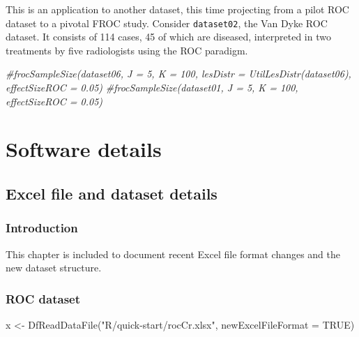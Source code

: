 \documentclass[
]{book}
\newenvironment{Shaded}{\begin{snugshade}}{\end{snugshade}}
\newcommand{\AttributeTok}[1]{\textcolor[rgb]{0.77,0.63,0.00}{#1}}
\newcommand{\CommentTok}[1]{\textcolor[rgb]{0.56,0.35,0.01}{\textit{#1}}}
\newcommand{\ConstantTok}[1]{\textcolor[rgb]{0.00,0.00,0.00}{#1}}
\newcommand{\FunctionTok}[1]{\textcolor[rgb]{0.00,0.00,0.00}{#1}}
\newcommand{\NormalTok}[1]{#1}
\newcommand{\OtherTok}[1]{\textcolor[rgb]{0.56,0.35,0.01}{#1}}
\newcommand{\StringTok}[1]{\textcolor[rgb]{0.31,0.60,0.02}{#1}}
\begin{document}
This is an application to another dataset, this time projecting from a pilot ROC dataset to a pivotal FROC study. Consider \texttt{dataset02}, the Van Dyke ROC dataset. It consists of 114 cases, 45 of which are diseased, interpreted in two treatments by five radiologists using the ROC paradigm.

\begin{Shaded}
\begin{Highlighting}[]
\CommentTok{\#frocSampleSize(dataset06, J = 5, K = 100, lesDistr = UtilLesDistr(dataset06), effectSizeROC = 0.05)}
\CommentTok{\#frocSampleSize(dataset01, J = 5, K = 100, effectSizeROC = 0.05)}
\end{Highlighting}
\end{Shaded}

\hypertarget{part-software-details}{%
\part*{Software details}\label{part-software-details}}

\hypertarget{dataset-object-details}{%
\chapter{Excel file and dataset details}\label{dataset-object-details}}

\hypertarget{introduction-1}{%
\section{Introduction}\label{introduction-1}}

This chapter is included to document recent Excel file format changes and the new dataset structure.

\hypertarget{dataset-object-details-roc-dataset}{%
\section{ROC dataset}\label{dataset-object-details-roc-dataset}}

\begin{Shaded}
\begin{Highlighting}[]
\NormalTok{x }\OtherTok{\textless{}{-}} \FunctionTok{DfReadDataFile}\NormalTok{(}\StringTok{"R/quick{-}start/rocCr.xlsx"}\NormalTok{, }\AttributeTok{newExcelFileFormat =} \ConstantTok{TRUE}\NormalTok{)}
\end{Highlighting}
\end{Shaded}
\end{document}
